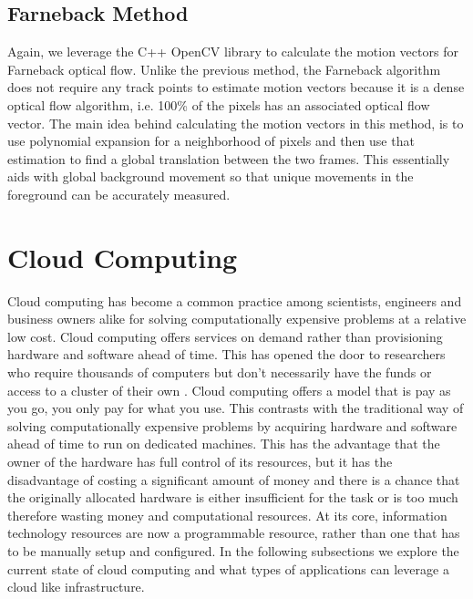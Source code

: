 \subsection{\label{subsection:farneback_method}Farneback Method} Again, we
leverage the C++ OpenCV library to calculate the motion vectors for Farneback
optical flow. Unlike the previous method, the Farneback algorithm does not
require any track points to estimate motion vectors because it is a dense
optical flow algorithm, i.e. 100\% of the pixels has an associated optical flow
vector. The main idea behind calculating the motion vectors in this method, is
to use polynomial expansion for a neighborhood of pixels \cite{farneback2003two}
and then use that estimation to find a global translation between the two
frames. This essentially aids with global background movement so that unique
movements in the foreground can be accurately measured.

\section{\label{section:cloud_computing}Cloud Computing}
Cloud computing has become a common practice among scientists, engineers and
business owners
alike for solving computationally expensive problems at a relative low cost.
Cloud computing offers services on demand rather than provisioning hardware and
software ahead of time. This has opened the door to researchers who require
thousands of computers but don't necessarily have the funds or access to a
cluster of their own \cite{armbrust2009above}. Cloud computing offers a model
that is pay as you go, you only pay for what you use. This contrasts with the
traditional way of solving computationally expensive problems by acquiring
hardware and software ahead of time to run on dedicated machines. This has the
advantage that the owner of the hardware has full control of its resources, but
it has the disadvantage of costing a significant amount of money and there is a
chance that the originally allocated hardware is  either insufficient for the
task or is too much therefore wasting money and computational resources.  At its
core, information technology resources are now a programmable resource, rather
than one that has to be manually setup and configured. In the following
subsections we explore the current state of cloud computing and what types of
applications can leverage a cloud like infrastructure.

